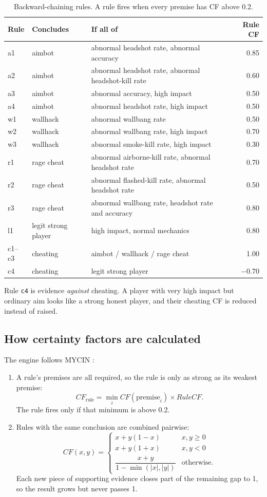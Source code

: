 \documentclass[11pt,a4paper]{article}
\newcommand{\code}[1]{\texttt{#1}}
\begin{document}
\begin{table}[H]
\centering
\small
\caption{Backward-chaining rules. A rule fires when every premise has CF above 0.2.}
\label{tab:rules}
\begin{tabular}{llp{7.6cm}r}
\toprule
Rule & Concludes & If all of & Rule CF \\
\midrule
a1 & aimbot & abnormal headshot rate, abnormal accuracy & 0.85 \\
a2 & aimbot & abnormal headshot rate, abnormal headshot-kill rate & 0.60 \\
a3 & aimbot & abnormal accuracy, high impact & 0.50 \\
a4 & aimbot & abnormal headshot rate, high impact & 0.50 \\
w1 & wallhack & abnormal wallbang rate & 0.50 \\
w2 & wallhack & abnormal wallbang rate, high impact & 0.70 \\
w3 & wallhack & abnormal smoke-kill rate, high impact & 0.30 \\
r1 & rage cheat & abnormal airborne-kill rate, abnormal headshot rate & 0.70 \\
r2 & rage cheat & abnormal flashed-kill rate, abnormal headshot rate & 0.50 \\
r3 & rage cheat & abnormal wallbang rate, headshot rate and accuracy & 0.80 \\
l1 & legit strong player & high impact, normal mechanics & 0.80 \\
c1--c3 & cheating & aimbot / wallhack / rage cheat & 1.00 \\
c4 & cheating & legit strong player & $-0.70$ \\
\bottomrule
\end{tabular}
\end{table}

Rule \code{c4} is evidence \emph{against} cheating. A player with very high impact but ordinary aim
looks like a strong honest player, and their cheating CF is reduced instead of raised.

\subsection{How certainty factors are calculated}
\label{sec:cf}
The engine follows MYCIN \cite{shortliffe1975}:
\begin{enumerate}
  \item A rule's premises are all required, so the rule is only as strong as its weakest premise:
        \[ \mathit{CF}_{\text{rule}} = \min_i \mathit{CF}(\text{premise}_i) \times \mathit{RuleCF}. \]
        The rule fires only if that minimum is above 0.2.
  \item Rules with the same conclusion are combined pairwise:
  \[
  \mathit{CF}(x,y) =
  \begin{cases}
    x + y(1-x) & x, y \ge 0 \\
    x + y(1+x) & x, y < 0 \\
    \dfrac{x+y}{1-\min(|x|,|y|)} & \text{otherwise.}
  \end{cases}
  \]
  Each new piece of supporting evidence closes part of the remaining gap to 1, so the result grows
  but never passes 1.
\end{enumerate}
\end{document}

